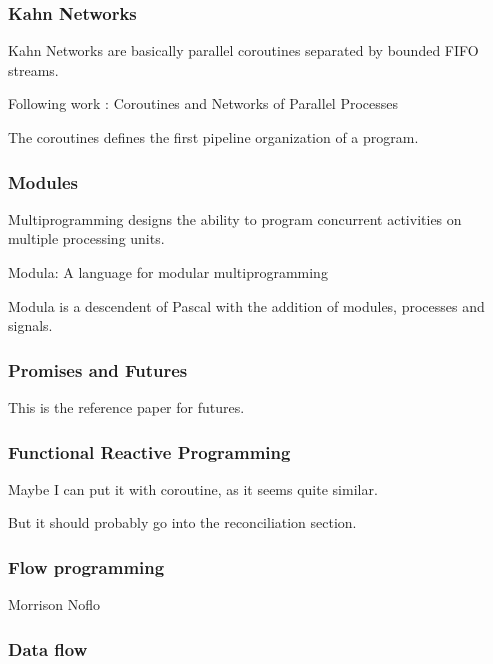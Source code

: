 \subsubsection{Kahn Networks}

Kahn Networks are basically parallel coroutines separated by bounded FIFO streams.



Following work : Coroutines and Networks of Parallel Processes\cite{Kahn1976}

The coroutines defines the first pipeline organization of a program.

\subsubsection{Modules}

Multiprogramming designs the ability to program concurrent activities on multiple processing units.

Modula: A language for modular multiprogramming \cite{Wirth1977}

Modula is a descendent of Pascal with the addition of modules, processes and signals.


\subsubsection{Promises and Futures}

This \cite{Jr1977} is the reference paper for futures.

\subsubsection{Functional Reactive Programming}

Maybe I can put it with coroutine, as it seems quite similar.

But it should probably go into the reconciliation section.

\subsubsection{Flow programming}
Morrison
Noflo

\subsubsection{Data flow}

